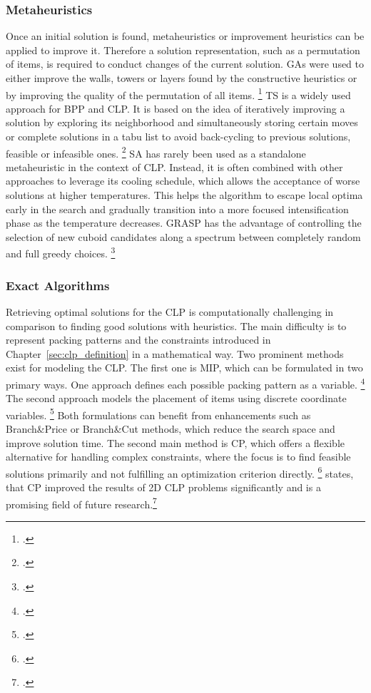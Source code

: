 \subsubsection{Metaheuristics}
Once an initial solution is found, metaheuristics or improvement heuristics can be applied
to improve it. Therefore a solution representation, such as a permutation of items, is required
to conduct changes of the current solution. \gls{GA}s were
used to either improve the walls, towers or layers found by the constructive heuristics
or by improving the quality of the permutation of all items. \footcite[cf.][]{gehring_genetic_1997}
\gls{TS} is a widely used approach for \gls{BPP} and \gls{CLP}. It is based on
the idea of iteratively improving a solution by exploring its neighborhood and simultaneously
storing certain moves or complete solutions in a tabu list to avoid back-cycling to
previous solutions, feasible or infeasible ones. \footcite[cf.][pp. 344--345]{gendreau_tabu_2006} \gls{SA} has rarely been used as a
standalone metaheuristic in the context of \gls{CLP}. Instead, it is often combined
with other approaches to leverage its cooling schedule, which allows the acceptance of
worse solutions at higher temperatures. This helps the algorithm to escape local optima
early in the search and gradually transition into a more focused intensification phase as
the temperature decreases. \gls{GRASP} has the advantage of controlling the selection of new
cuboid candidates along a spectrum between completely random and full greedy choices. \footcite[cf.][]{moura_grasp_2005}

\subsubsection{Exact Algorithms}
Retrieving optimal solutions for the \gls{CLP} is computationally challenging in comparison
to finding good solutions with heuristics. The main difficulty is to represent packing
patterns and the constraints introduced in Chapter~\ref{sec:clp_definition} in a mathematical way.
Two prominent methods exist for modeling the \gls{CLP}. The first one is \gls{MIP}, which can be
formulated in two primary ways. One approach defines each possible packing pattern as
a variable. \footcite[cf.][pp. 29--30]{zhu_prototype_2012} The second approach models
the placement of items using discrete coordinate variables. \footcite[cf.][pp. 4--8]{moura_integrated_2009}
Both formulations can benefit from enhancements such as Branch\&Price or Branch\&Cut
methods, which reduce the search space and improve solution time.
The second main method is \gls{CP}, which offers a flexible alternative for handling
complex constraints, where the focus is to find feasible solutions primarily and
not fulfilling an optimization criterion directly. \footcites[cf.][pp. 5--8]{kucuk_constraint_2022}[cf.][pp. 7--11]{tamke_branch-and-cut_2024} \citeauthor*{iori_exact_2021} states, that
\gls{CP} improved the results of 2D \gls{CLP} problems significantly and is a promising
field of future research.\footcite[cf.][p. 23]{iori_exact_2021}

